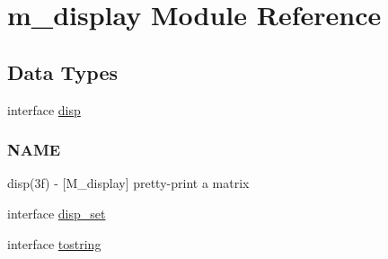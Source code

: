 \hypertarget{namespacem__display}{}\section{m\+\_\+display Module Reference}
\label{namespacem__display}
\subsection*{Data Types}
\begin{DoxyCompactItemize}
\item 
interface \hyperlink{interfacem__display_1_1disp}{disp}
\begin{DoxyCompactList}\small\item\em \subsubsection*{N\+A\+ME}

disp(3f) -\/ \mbox{[}M\+\_\+display\mbox{]} pretty-\/print a matrix \end{DoxyCompactList}\item 
interface \hyperlink{interfacem__display_1_1disp__set}{disp\+\_\+set}
\item 
interface \hyperlink{interfacem__display_1_1tostring}{tostring}
\end{DoxyCompactItemize}
